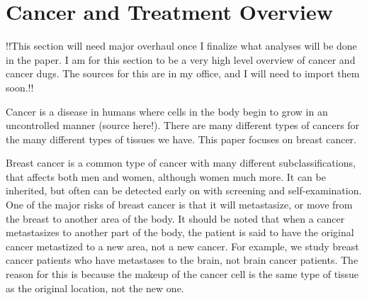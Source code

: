 \section{Cancer and Treatment Overview}
\label{app:apdxb}
!!This section will need major overhaul once I finalize what analyses will be done in the paper. I am for this section to be a very high level overview of cancer and cancer dugs. The sources for this are in my office, and I will need to import them soon.!!

Cancer is a disease in humans where cells in the body begin to grow in an uncontrolled manner (source here!). There are many different types of cancers for the many different types of tissues we have. This paper focuses on breast cancer.

Breast cancer is a common type of cancer with many different subclassifications, that affects both men and women, although women much more. It can be inherited, but often can be detected early on with screening and self-examination. One of the major risks of breast cancer is that it will metastasize, or move from the breast to another area of the body. It should be noted that when a cancer metastasizes to another part of the body, the patient is said to have the original cancer metastized to a new area, not a new cancer. For example, we study breast cancer patients who have metastases to the brain, not brain cancer patients. The reason for this is because the makeup of the cancer cell is the same type of tissue as the original location, not the new one.

